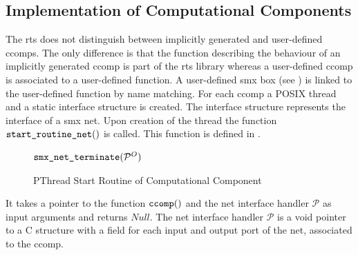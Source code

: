 \subsection{Implementation of Computational Components}
\label{sect_tool_rts_ccomp}
The \gls{rts} does not distinguish between implicitly generated and user-defined \glspl*{ccomp}.
The only difference is that the function describing the behaviour of an implicitly generated \gls*{ccomp} is part of the \gls{rts} library whereas a user-defined \gls*{ccomp} is associated to a user-defined function.
A user-defined \gls*{smx} box (see \Sect{\ref{sect_smx_box_user}}) is linked to the user-defined function by name matching.
For each \gls*{ccomp} a POSIX thread and a static interface structure is created.
The interface structure represents the interface of a \gls*{smx} net.
Upon creation of the thread the function $\textnormal{\tt start\_routine\_net}()$ is called.
This function is defined in \Alg{\ref{alg_rts_thread}}.
\begin{figure}[bht]
    \TopAlgSpace
    \removelatexerror
    \begin{algorithm}[H]
        \caption{PThread Start Routine of Computational Component}
        \label{alg_rts_thread}
        \begin{algorithmic}[1]
            \Statex
            \EndWhile
            \State $\textnormal{\tt smx\_net\_terminate}( \mathcal{P}^O )$
            \State {}
            \EndFunction
        \end{algorithmic}
    \end{algorithm}
    \BotAlgSpace
\end{figure}
It takes a pointer to the function $\textnormal{\tt ccomp}()$ and the net interface handler $\mathcal{P}$ as input arguments and returns $\mathit{Null}$.
The net interface handler $\mathcal{P}$ is a void pointer to a C structure with a field for each input and output port of the net, associated to the \gls*{ccomp}.
